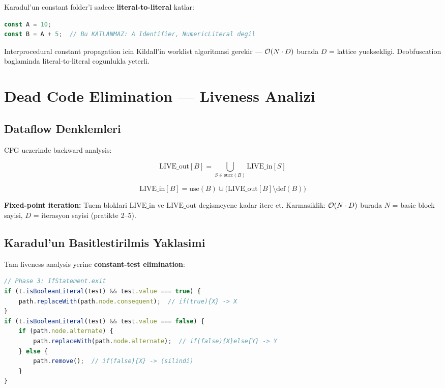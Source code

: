 Karadul'un constant folder'i sadece \textbf{literal-to-literal} katlar:

\begin{lstlisting}[language=JavaScript]
const A = 10;
const B = A + 5;  // Bu KATLANMAZ: A Identifier, NumericLiteral degil
\end{lstlisting}

Interprocedural constant propagation icin Kildall'in worklist algoritmasi gerekir --- $\mathcal{O}\!\left(N \cdot D\right)$ burada $D$ = lattice yueksekligi. Deobfuscation baglaminda literal-to-literal cogunlukla yeterli.


\section{Dead Code Elimination --- Liveness Analizi}
\label{sec:dce-deep}

\subsection{Dataflow Denklemleri}

CFG uezerinde backward analysis:

\begin{equation}
\text{LIVE\_out}[B] = \bigcup_{S \in \text{succ}(B)} \text{LIVE\_in}[S]
\end{equation}

\begin{equation}
\text{LIVE\_in}[B] = \text{use}(B) \cup \big(\text{LIVE\_out}[B] \setminus \text{def}(B)\big)
\end{equation}

\textbf{Fixed-point iteration:} Tuem bloklari $\text{LIVE\_in}$ ve $\text{LIVE\_out}$ degismeyene kadar itere et. Karmasiklik: $\mathcal{O}\!\left(N \cdot D\right)$ burada $N$ = basic block sayisi, $D$ = iterasyon sayisi (pratikte 2--5).

\subsection{Karadul'un Basitlestirilmis Yaklasimi}

Tam liveness analysis yerine \textbf{constant-test elimination}:

\begin{lstlisting}[language=JavaScript]
// Phase 3: IfStatement.exit
if (t.isBooleanLiteral(test) && test.value === true) {
    path.replaceWith(path.node.consequent);  // if(true){X} -> X
}
if (t.isBooleanLiteral(test) && test.value === false) {
    if (path.node.alternate) {
        path.replaceWith(path.node.alternate);  // if(false){X}else{Y} -> Y
    } else {
        path.remove();  // if(false){X} -> (silindi)
    }
}
\end{lstlisting}


